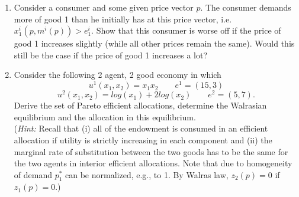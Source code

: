 \documentclass[a4paper,12pt]{article}
\begin{document}
\begin{enumerate}[resume]
\item Consider a consumer and some given price vector $p$. The consumer demands more of good 1 than he initially has at this price vector, i.e. $x^i_1(p,m^i(p))>e^i_1$. Show that this consumer is worse off if the price of good 1 increases slightly (while all other prices remain the same). Would this still be the case if the price of good 1 increases a lot?
\item Consider the following 2 agent, 2 good economy in which
  $$u^1(x_1,x_2)=x_1x_2 \qquad  e^1=(15,3)$$
  $$u^2(x_1,x_2)= log(x_1)+2 log(x_2) \qquad  e^2=(5,7).$$
  Derive the set of Pareto efficient allocations, determine the Walrasian equilibrium and the allocation in this equilibrium.\\
  (\emph{Hint:} Recall that (i) all of the endowment is consumed in an efficient allocation if utility is strictly increasing in each component and (ii) the marginal rate of substitution between the two goods has to be the same for the two agents in interior efficient allocations. Note that due to homogeneity of demand $p_1^*$ can be normalized, e.g., to 1. By Walras law, $z_2(p)=0$ if $z_1(p)=0$.)
\end{enumerate}
\end{document}

